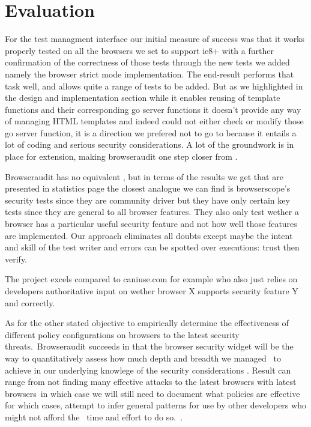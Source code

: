 \chapter{Evaluation}


For the test managment interface our initial measure of success was that it works properly tested on all the browsers we set to support
ie8+ with a further confirmation of the correctness of those tests through the new tests we added namely the browser strict mode implementation.
The end-result performs that task well, and allows quite a range of tests to be added. But as we highlighted in the design and implementation section
while it enables reusing of template functions and their corresponding go server functions it doesn't provide any way of managing HTML templates
and indeed could not either check or modify those go server function, it is a direction we prefered not to go to because it entails a lot of coding
and serious security considerations. A lot of the groundwork is in place for extension, making browseraudit one step closer from .

Browseraudit has no equivalent , but in terms of the results we get that are presented in statistics page the closest analogue we can find is
browserscope's security tests \cite{browsercope} since they are community driver but they have only certain key tests since they are general to all
browser features. They also only test wether a browser has a particular useful security feature and not how well those features are implemented.
Our approach eliminates all doubts except maybe the intent and skill of the test writer and errors can be spotted over executions: trust then verify.

The project excels compared to caniuse.com for example who also just relies on developers authoritative input on wether browser X supports security
feature Y and correctly.



As for the other stated objective to empirically determine the effectiveness of different policy configurations on browsers to the latest security threats.\
Browseraudit succeeds in that the browser security widget will be the way to quantitatively assess how much depth and breadth we managed \
to achieve in our underlying knowlege of the security considerations . Result can range from not finding many effective attacks to the latest browsers with latest browsers\
in which case we will still need to document what policies are effective for which cases, attempt to infer general patterns for use by other developers who might not afford the \
time and effort to do so.\ .


